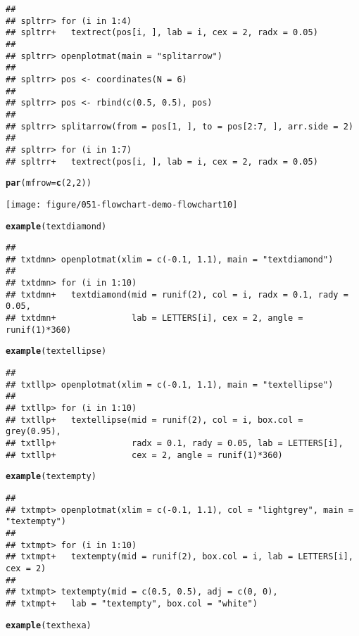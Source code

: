 \documentclass{article}\usepackage[]{graphicx}\usepackage[]{color}
\makeatletter
\def\maxwidth{ %
  \ifdim\Gin@nat@width>\linewidth
    \linewidth
  \else
    \Gin@nat@width
  \fi
}
\newcommand{\hlnum}[1]{\textcolor[rgb]{0.686,0.059,0.569}{#1}}%
\newcommand{\hlstd}[1]{\textcolor[rgb]{0.345,0.345,0.345}{#1}}%
\newcommand{\hlkwc}[1]{\textcolor[rgb]{0.333,0.667,0.333}{#1}}%
\newcommand{\hlkwd}[1]{\textcolor[rgb]{0.737,0.353,0.396}{\textbf{#1}}}%
\newenvironment{kframe}{%
 \def\at@end@of@kframe{}%
 \ifinner\ifhmode%
  \def\at@end@of@kframe{\end{minipage}}%
  \begin{minipage}{\columnwidth}%
 \fi\fi%
 \def\FrameCommand##1{\hskip\@totalleftmargin \hskip-\fboxsep
 \colorbox{shadecolor}{##1}\hskip-\fboxsep
     \hskip-\linewidth \hskip-\@totalleftmargin \hskip\columnwidth}%
 \MakeFramed {\advance\hsize-\width
   \@totalleftmargin\z@ \linewidth\hsize
   \@setminipage}}%
 {\par\unskip\endMakeFramed%
 \at@end@of@kframe}
\newenvironment{knitrout}{}{} %
\makeatother
\begin{document}
\begin{knitrout}
\begin{kframe}
\begin{verbatim}
## 
## spltrr> for (i in 1:4) 
## spltrr+   textrect(pos[i, ], lab = i, cex = 2, radx = 0.05)
## 
## spltrr> openplotmat(main = "splitarrow")
## 
## spltrr> pos <- coordinates(N = 6)
## 
## spltrr> pos <- rbind(c(0.5, 0.5), pos)
## 
## spltrr> splitarrow(from = pos[1, ], to = pos[2:7, ], arr.side = 2)
## 
## spltrr> for (i in 1:7)
## spltrr+   textrect(pos[i, ], lab = i, cex = 2, radx = 0.05)
\end{verbatim}
\begin{alltt}
\hlkwd{par}\hlstd{(}\hlkwc{mfrow} \hlstd{=} \hlkwd{c}\hlstd{(}\hlnum{2}\hlstd{,} \hlnum{2}\hlstd{))}
\end{alltt}
\end{kframe}
\texttt{[image: figure/051-flowchart-demo-flowchart10]} 
\begin{kframe}\begin{alltt}
\hlkwd{example}\hlstd{(textdiamond)}
\end{alltt}
\begin{verbatim}
## 
## txtdmn> openplotmat(xlim = c(-0.1, 1.1), main = "textdiamond")
## 
## txtdmn> for (i in 1:10) 
## txtdmn+   textdiamond(mid = runif(2), col = i, radx = 0.1, rady = 0.05,
## txtdmn+               lab = LETTERS[i], cex = 2, angle = runif(1)*360)
\end{verbatim}
\begin{alltt}
\hlkwd{example}\hlstd{(textellipse)}
\end{alltt}
\begin{verbatim}
## 
## txtllp> openplotmat(xlim = c(-0.1, 1.1), main = "textellipse")
## 
## txtllp> for (i in 1:10) 
## txtllp+   textellipse(mid = runif(2), col = i, box.col = grey(0.95),
## txtllp+               radx = 0.1, rady = 0.05, lab = LETTERS[i],
## txtllp+               cex = 2, angle = runif(1)*360)
\end{verbatim}
\begin{alltt}
\hlkwd{example}\hlstd{(textempty)}
\end{alltt}
\begin{verbatim}
## 
## txtmpt> openplotmat(xlim = c(-0.1, 1.1), col = "lightgrey", main = "textempty")
## 
## txtmpt> for (i in 1:10) 
## txtmpt+   textempty(mid = runif(2), box.col = i, lab = LETTERS[i], cex = 2)
## 
## txtmpt> textempty(mid = c(0.5, 0.5), adj = c(0, 0), 
## txtmpt+   lab = "textempty", box.col = "white")
\end{verbatim}
\begin{alltt}
\hlkwd{example}\hlstd{(texthexa)}
\end{alltt}

\end{kframe}
\end{knitrout}
\end{document}
